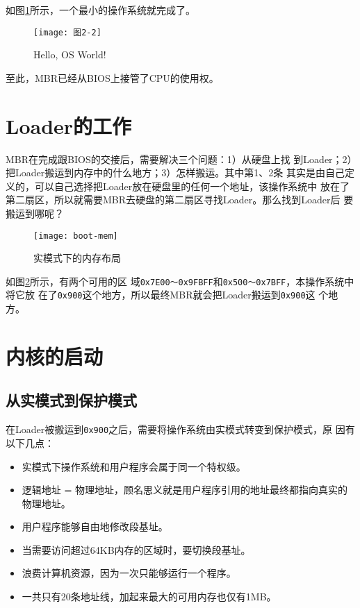 如图\ref{fig:img2-2}所示，一个最小的操作系统就完成了。

\begin{figure}[H]
  \centering
  \texttt{[image: 图2-2]}
  \caption{Hello, OS World!}
  \label{fig:img2-2}
\end{figure}

至此，MBR已经从BIOS上接管了CPU的使用权。

\section{Loader的工作}
\label{sec:Loader}

MBR在完成跟BIOS的交接后，需要解决三个问题：1）从硬盘上找
到Loader；2）把Loader搬运到内存中的什么地方；3）怎样搬运。其中第1、2条
其实是由自己定义的，可以自己选择把Loader放在硬盘里的任何一个地址，该操作系统中
放在了第二扇区，所以就需要MBR去硬盘的第二扇区寻找Loader。那么找到Loader后
要搬运到哪呢？

\begin{figure}
  \centering
  \texttt{[image: boot-mem]}
  \caption{实模式下的内存布局}
  \label{fig:neicun}
\end{figure}

如图\ref{fig:neicun}所示，有两个可用的区
域\texttt{0x7E00～0x9FBFF}和\texttt{0x500～0x7BFF}，本操作系统中将它放
在了\texttt{0x900}这个地方，所以最终MBR就会把Loader搬运到\texttt{0x900}这
个地方。

\section{内核的启动}
\label{sec:kernel}

\subsection{从实模式到保护模式}
\label{subsec:protect}

在Loader被搬运到\texttt{0x900}之后，需要将操作系统由实模式转变到保护模式\cite{LWY2013}，原
因有以下几点：
\begin{itemize}
\item 实模式下操作系统和用户程序会属于同一个特权级。
\item 逻辑地址 = 物理地址，顾名思义就是用户程序引用的地址最终都指向真实的物理地址。
\item 用户程序能够自由地修改段基址。
\item 当需要访问超过64KB内存的区域时，要切换段基址。
\item 浪费计算机资源，因为一次只能够运行一个程序。
\item 一共只有20条地址线，加起来最大的可用内存也仅有1MB。
\end{itemize}

